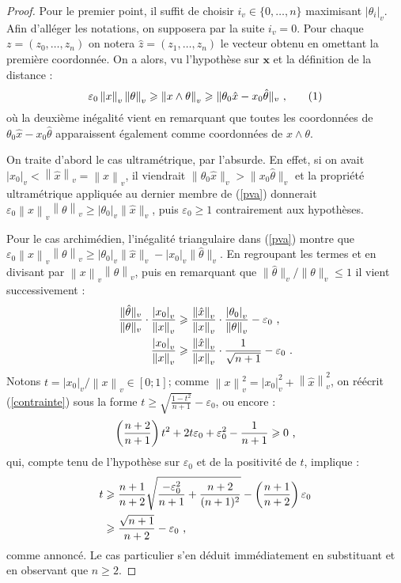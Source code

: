 \documentclass[11pt, twoside, a4paper, french]{article}
\numberwithin{equation}{section}
\renewcommand{\ge}{\geqslant} \renewcommand{\le}{\leqslant}
\newcommand{\eps}{\varepsilon} \newcommand{\truc}{\,\cdot\,}
\newcommand{\av}[2][v]{\left\lvert#2\right\rvert_{#1}} 		%
\newcommand{\nv}[2][v]{\left\lVert#2\right\rVert_{#1}} 		%
\newcommand{\nvp}[2][v]{\|#2\|_{#1}} 				%
\newcommand{\p}[1]{{\boldsymbol{#1}}} 				%
\newcommand{\coa}{\theta} 					%
\begin{document}
\begin{proof}
Pour le premier point, il suffit de choisir $i_v \in \{ 0, \dots, n\}$ maximisant $\av{\coa_i}$. Afin d'alléger les notations, on supposera par la suite $i_v = 0$. Pour chaque $z = (z_0, \dots, z_n)$ on notera $\hat{z} = (z_1, \dots, z_n)$ le vecteur obtenu en omettant la première coordonnée. On a alors, vu l'hypothèse sur $\p{x}$ et la définition de la distance :
\[ \eps_0 \nv{x}\nv{\coa}  \ge \nv{x \wedge \coa} \ge \nvp{\coa_0 \hat{x} - x_0 \hat{\coa}} \pmm{,} \label{pva} \tag{1}\]
où la deuxième inégalité vient en remarquant que toutes les coordonnées de $\coa_0 \hat{x} - x_0 \hat{\coa}$ apparaissent également comme coordonnées de $x \wedge \coa$.

On traite d'abord le cas ultramétrique, par l'absurde. En effet, si on avait $\av{x_0}< \nv{\hat{x}} = \nv{x}$, il viendrait $\nvp{\coa_0 \hat{x}} > \nvp{x_0 \hat{\coa}}$ et la propriété ultramétrique appliquée au dernier membre de (\ref{pva}) donnerait $\eps_0 \nv{x}\nv{\coa}  \ge \av{\coa_0}\nvp{\hat{x}}$, puis $\eps_0 \ge 1$ contrairement aux hypothèses.

Pour le cas archimédien, l'inégalité triangulaire dans (\ref{pva}) montre que $\eps_0 \nv{x}\nv{\coa}  \ge \av{\coa_0}\nvp{\hat{x}} - \av{x_0}\nvp{\hat{\coa}} $. En regroupant les termes et en divisant par $\nv{x}\nv{\coa}$, puis en remarquant que $\nvp{\hat{\coa}}/\nvp{\coa} \le 1$ il vient successivement :
\begin{align}
\frac{\nvp{\hat{\coa}}}{\nvp{\coa}} \cdot \frac{\av{x_0}}{\nv{x}}
	& \ge \frac{\nv{\hat{x}}}{\nv{x}}\cdot \frac{\av{\coa_0}}{\nv{\coa}} - \eps_0 \pmm{,} \notag \\
\frac{\av{x_0}}{\nv{x}} & \ge \frac{\nv{\hat{x}}}{\nv{x}}\cdot\frac{1}{\sqrt{n+1}} - \eps_0 \pmm{.} \label{contrainte}
\end{align}
Notons $t = \av{x_0}/\nv{x} \in [0; 1]$; comme $\nv{x}^2 = \av{x_0}^2 + \nv{\hat{x}}^2$, on réécrit (\ref{contrainte}) sous la forme $t \ge \sqrt{\frac{1-t^2}{n+1}}-\eps_0$, ou encore :
\[ \left(\frac{n+2}{n+1}\right)t^2 + 2t\eps_0 + \eps_0^2 - \frac{1}{n+1} \ge 0 \pmm{,}\]
qui, compte tenu de l'hypothèse sur $\eps_0$ et de la positivité de $t$, implique :
\begin{align*}
t & \ge \frac{n+1}{n+2}\sqrt{\frac{-\eps_0^2}{n+1}+\frac{n+2}{(n+1)^2}} - \left(\frac{n+1}{n+2}\right)\eps_0\\
& \ge \frac{\sqrt{n+1}}{n+2} - \eps_0 \pmm{,}
\end{align*}
comme annoncé. Le cas particulier s'en déduit immédiatement en substituant et en observant que $n \ge 2$.
\end{proof}
\end{document}
